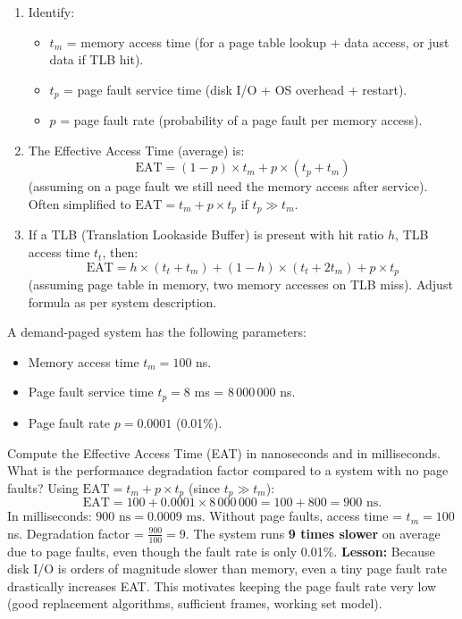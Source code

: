 \documentclass[11pt]{article}
\newcommand{\cle}[1]{{\popxbold\color{popdark}#1}}
\begin{document}
\begin{methode}
\begin{enumerate}
\item Identify:
\begin{itemize}
\item $t_m$ = memory access time (for a page table lookup + data access, or just data if TLB hit).
\item $t_p$ = page fault service time (disk I/O + OS overhead + restart).
\item $p$ = page fault rate (probability of a page fault per memory access).
\end{itemize}
\item The \cle{Effective Access Time} (average) is:
\[
\text{EAT} = (1-p) \times t_m + p \times (t_p + t_m)
\]
(assuming on a page fault we still need the memory access after service). Often simplified to $\text{EAT} = t_m + p \times t_p$ if $t_p \gg t_m$.
\item If a \cle{TLB} (Translation Lookaside Buffer) is present with hit ratio $h$, TLB access time $t_t$, then:
\[
\text{EAT} = h \times (t_t + t_m) + (1-h) \times (t_t + 2t_m) + p \times t_p
\]
(assuming page table in memory, two memory accesses on TLB miss). Adjust formula as per system description.
\end{enumerate}
\end{methode}

\begin{exoresolu}
A demand-paged system has the following parameters:
\begin{itemize}
\item Memory access time $t_m = 100$ ns.
\item Page fault service time $t_p = 8$ ms = $8\,000\,000$ ns.
\item Page fault rate $p = 0.0001$ (0.01\%).
\end{itemize}
Compute the Effective Access Time (EAT) in nanoseconds and in milliseconds. What is the performance degradation factor compared to a system with no page faults?
\tcblower
Using $\text{EAT} = t_m + p \times t_p$ (since $t_p \gg t_m$):
\[
\text{EAT} = 100 + 0.0001 \times 8\,000\,000 = 100 + 800 = 900 \text{ ns}.
\]
In milliseconds: $900 \text{ ns} = 0.0009 \text{ ms}$.
Without page faults, access time = $t_m = 100$ ns.
Degradation factor = $\frac{900}{100} = 9$. The system runs \textbf{9 times slower} on average due to page faults, even though the fault rate is only 0.01\%.
\textbf{Lesson:} Because disk I/O is orders of magnitude slower than memory, even a tiny page fault rate drastically increases EAT. This motivates keeping the page fault rate very low (good replacement algorithms, sufficient frames, working set model).
\end{exoresolu}
\end{document}
